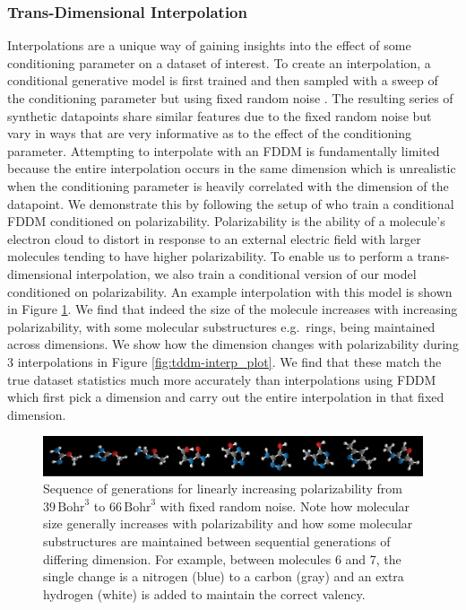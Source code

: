 \subsubsection{Trans-Dimensional Interpolation}
\label{sec:mol_interp}
Interpolations are a unique way of gaining insights into the effect of some conditioning parameter on a dataset of interest.
To create an interpolation, a conditional generative model is first trained and then sampled with a sweep of the conditioning parameter but using fixed random noise \cite{hoogeboom2022equivariant}.
The resulting series of synthetic datapoints share similar features due to the fixed random noise but vary in ways that are very informative as to the effect of the conditioning parameter. 
Attempting to interpolate with an FDDM is fundamentally limited because the entire interpolation occurs in the same dimension which is unrealistic when the conditioning parameter is heavily correlated with the dimension of the datapoint. We demonstrate this by following the setup of \cite{hoogeboom2022equivariant} who train a conditional FDDM conditioned on polarizability.
Polarizability is the ability of a molecule's electron cloud to distort in response to an external electric field \cite{modernphysicalorganicchemistry} with larger molecules tending to have higher polarizability. To enable us to perform a trans-dimensional interpolation, we also train a conditional version of our model conditioned on polarizability. An example interpolation with this model is shown in Figure \ref{fig:tddm-interp}. We find that indeed the size of the molecule increases with increasing polarizability, with some molecular substructures e.g.~rings, being maintained across dimensions.
We show how the dimension changes with polarizability during 3 interpolations in Figure \ref{fig:tddm-interp_plot}. We find that these match the true dataset statistics much more accurately than interpolations using FDDM which first pick a dimension and carry out the entire interpolation in that fixed dimension.

\begin{figure}[h]
    \centering
    \includegraphics[width=\textwidth]{figs/tddm/small_interp_bright.pdf}
    \caption{Sequence of generations for linearly increasing polarizability from $39 \, \text{Bohr}^3$ to $66 \, \text{Bohr}^3$ with fixed random noise. Note how molecular size generally increases with polarizability and how some molecular substructures are maintained between sequential generations of differing dimension. For example, between molecules 6 and 7, the single change is a nitrogen (blue) to a carbon (gray) and an extra hydrogen (white) is added to maintain the correct valency.}
    \label{fig:tddm-interp}
\end{figure}




